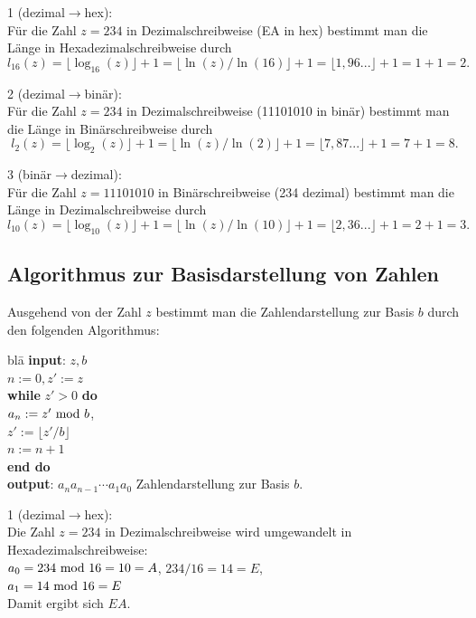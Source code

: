 \begin{refsegment}
\begin{example}{ 1 (dezimal$\rightarrow$hex):}\\
Für die Zahl $z = 234$ in Dezimalschreibweise (EA in hex) bestimmt man die
Länge in Hexadezimalschreibweise durch
$$l_{16}(z) = \lfloor \log_{16}(z) \rfloor + 1 = \lfloor \ln (z) / \ln(16) \rfloor + 1 = \lfloor 1,96... \rfloor + 1 = 1 + 1 = 2.$$
\end{example}

\begin{example}{ 2 (dezimal$\rightarrow$binär):}\\
Für die Zahl $z = 234$ in Dezimalschreibweise (11101010 in binär) bestimmt
man die Länge in Binärschreibweise durch
$$l_{2}(z) = \lfloor \log_{2}(z) \rfloor + 1 = \lfloor \ln (z) / \ln(2) \rfloor + 1 = \lfloor 7,87... \rfloor + 1 = 7 + 1 = 8.$$
\end{example}

\begin{example}{ 3 (binär$\rightarrow$dezimal):}\\
Für die Zahl $z = 11101010$ in Binärschreibweise (234 dezimal) bestimmt
man die Länge in Dezimalschreibweise durch
$$l_{10}(z) = \lfloor \log_{10}(z) \rfloor + 1 = \lfloor \ln (z) / \ln(10) \rfloor + 1 = \lfloor 2,36... \rfloor + 1 = 2 + 1 = 3.$$
\end{example}



\subsection*{Algorithmus zur Basisdarstellung von Zahlen}
Ausgehend von der Zahl $z$ bestimmt man die Zahlendarstellung zur Basis $b$
durch den folgenden Algorithmus:
\begin{tabbing}
bla\= \kill
\textbf{input}: $z, b$\\
$n := 0, z' := z$\\
\textbf{while} $z' > 0$ \textbf{do}\\
 \> $a_n := z' {\rm ~mod~} b$,\\
 \> $z' := \lfloor z' / b \rfloor$\\
 \> $n := n+1$\\
\textbf{end do}\\
\textbf{output}:  $a_n a_{n-1} \cdots a_1 a_0$ Zahlendarstellung zur Basis $b$.
\end{tabbing}


\begin{example}{ 1 (dezimal$\rightarrow$hex):}\\
Die Zahl $z = 234$ in Dezimalschreibweise wird umgewandelt in Hexadezimalschreibweise:\\
$a_0 = 234 {\rm ~mod~} 16 = 10 = A$, $234 / 16 = 14 = E$,\\
$a_1 = 14 {\rm ~mod~} 16 = E$\\
Damit ergibt sich $EA$.
\end{example}



\end{refsegment}

